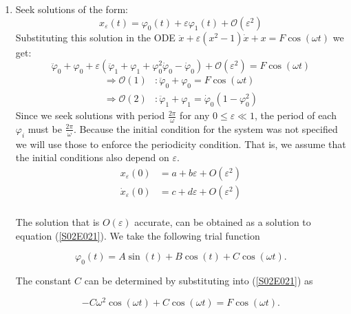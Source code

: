\documentclass[twoside,10pt,a4paper]{article}
\begin{document}
\begin{enumerate}[label=(\roman*)]
\item Seek solutions of the form:
\begin{equation*}
	x_\varepsilon(t)=\varphi_0(t)+ \varepsilon\varphi_1(t) + \mathcal{O}(\varepsilon^2)
\end{equation*}
Substituting this solution in the ODE $\ddot{x} + \varepsilon(x^2-1)\dot{x} + x = F\cos(\omega t)$ we get:
\begin{equation*}
	\ddot{\varphi}_0 + \varphi_0 + \varepsilon(\ddot{\varphi}_1 + \varphi_1 + \varphi_0^2\dot{\varphi}_0 - \dot{\varphi}_0) + \mathcal{O}(\varepsilon^2) = F\cos(\omega t)
\end{equation*}
\begin{align}
	\Longrightarrow \mathcal{O}(1) &: \ddot{\varphi}_0 + \varphi_0 = F\cos(\omega t) \label{S02E021} \\
	\Longrightarrow \mathcal{O}(2) &: \ddot{\varphi}_1 + \varphi_1 = \dot{\varphi}_0(1-\varphi_0^2) \label{S02E022}
\end{align}
Since we seek solutions with period $\frac{2\pi}{\omega}$ for any $0\leq \varepsilon \ll 1$, the period of each $\varphi_i$ must be $\frac{2\pi}{\omega}$.
Because the initial condition for the system was not specified we will use those to enforce the periodicity condition. That is, we assume that the initial conditions also depend on $\varepsilon$.
\begin{align*}
x_\varepsilon(0) &= a + b\varepsilon + O(\varepsilon^2) \\
\dot{x}_\varepsilon(0) &= c + d\varepsilon + O(\varepsilon^2) \\
\end{align*}

The solution that is $O(\varepsilon)$ accurate, can be obtained as a solution to equation (\ref{S02E021}). We take the following trial function 

\begin{equation}
	\varphi_0(t) = A\sin(t) + B\cos(t) + C \cos(\omega t). \label{S02E023}
\end{equation}

The constant $C$ can be determined by substituting into (\ref{S02E021}) as

$$
-C\omega^2 \cos(\omega t) + C\cos(\omega t) = F \cos(\omega t).
$$


\end{enumerate}
\end{document}
